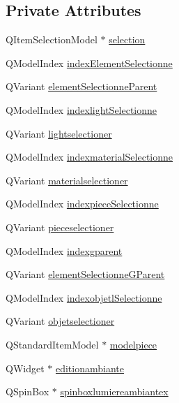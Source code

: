 \subsection*{Private Attributes}
\begin{DoxyCompactItemize}
\item 
Q\+Item\+Selection\+Model $\ast$ \hyperlink{class_mondock_aa0a94c4bfce0d7d4f2547da10d365275}{selection}
\item 
Q\+Model\+Index \hyperlink{class_mondock_a48e5355dbb076ca71a13e42172f342ca}{index\+Element\+Selectionne}
\item 
Q\+Variant \hyperlink{class_mondock_a5a0f5cf7817eee757956874e3bec2043}{element\+Selectionne\+Parent}
\item 
Q\+Model\+Index \hyperlink{class_mondock_ac8fa555c082f94d22d369eed852f93c3}{indexlight\+Selectionne}
\item 
Q\+Variant \hyperlink{class_mondock_a35acbdbc03ccc8bd255083f8499188f5}{lightselectioner}
\item 
Q\+Model\+Index \hyperlink{class_mondock_a8816860ad6351028d8d4e5b022b2b266}{indexmaterial\+Selectionne}
\item 
Q\+Variant \hyperlink{class_mondock_a09fab02186d86e999d23b4f9c667353f}{materialselectioner}
\item 
Q\+Model\+Index \hyperlink{class_mondock_ab950bd39d928049d2788f4690ba45755}{indexpiece\+Selectionne}
\item 
Q\+Variant \hyperlink{class_mondock_acc6d9454fd6ff20be6309e30aa5053c3}{pieceselectioner}
\item 
Q\+Model\+Index \hyperlink{class_mondock_a54452b93781c23fe0e40d764b2d278fe}{indexgparent}
\item 
Q\+Variant \hyperlink{class_mondock_a3c00ae3b69dc59785835aa2d04b73392}{element\+Selectionne\+G\+Parent}
\item 
Q\+Model\+Index \hyperlink{class_mondock_ab7756e9a6862132ca6b86d4b94c834c0}{indexobjetl\+Selectionne}
\item 
Q\+Variant \hyperlink{class_mondock_aba0697efe8eb1eff576ce6599aea10f3}{objetselectioner}
\item 
Q\+Standard\+Item\+Model $\ast$ \hyperlink{class_mondock_a2560c460ea144a4e8b2300dadf8df8ed}{modelpiece}
\item 
Q\+Widget $\ast$ \hyperlink{class_mondock_a958707eb3e7ab57d99934c167106dd0d}{editionambiante}
\item 
Q\+Spin\+Box $\ast$ \hyperlink{class_mondock_ae8eeb7a414be5aca3c4e893697f8970b}{spinboxlumiereambiantex}
\item 

\end{DoxyCompactItemize}
